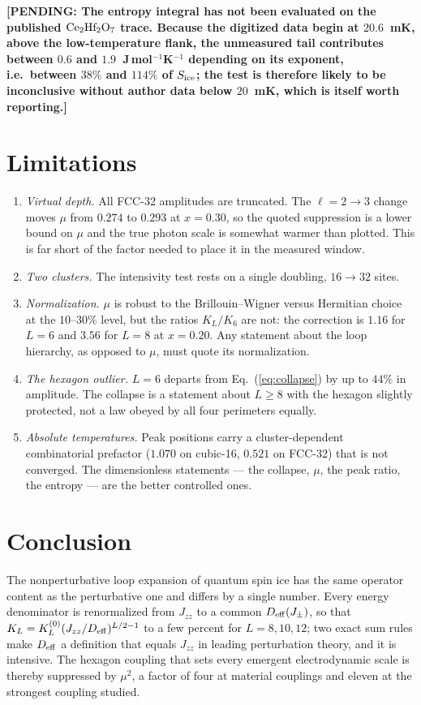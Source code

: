 \documentclass[aps,prb,preprint,amsmath,amssymb,superscriptaddress,
longbibliography,floatfix]{revtex4-2}
\newcommand{\Jzz}{J_{zz}}
\newcommand{\Jpm}{J_{\pm}}
\newcommand{\Deff}{D_{\rm eff}}
\newcommand{\pending}[1]{{\color{red}\textbf{[PENDING: #1]}}}
\begin{document}
\pending{The entropy integral has not been evaluated on the published
$\rm Ce_2Hf_2O_7$ trace.  Because the digitized data begin at $20.6$~mK, above
the low-temperature flank, the unmeasured tail contributes between $0.6$ and
$1.9$~J\,mol$^{-1}$K$^{-1}$ depending on its exponent, i.e.\ between $38\%$ and
$114\%$ of $S_{\rm ice}$; the test is therefore likely to be inconclusive
without author data below $20$~mK, which is itself worth reporting.}

\section{Limitations}
\label{sec:limits}

\begin{enumerate}
\item \emph{Virtual depth.}  All FCC-32 amplitudes are truncated.  The
$\ell=2\rightarrow3$ change moves $\mu$ from $0.274$ to $0.293$ at $x=0.30$,
so the quoted suppression is a lower bound on $\mu$ and the true photon scale
is somewhat warmer than plotted.  This is far short of the factor needed to
place it in the measured window.
\item \emph{Two clusters.}  The intensivity test rests on a single doubling,
$16\rightarrow32$ sites.
\item \emph{Normalization.}  $\mu$ is robust to the Brillouin--Wigner versus
Hermitian choice at the $10$--$30\%$ level, but the ratios $K_L/K_6$ are not:
the correction is $1.16$ for $L=6$ and $3.56$ for $L=8$ at $x=0.20$.  Any
statement about the loop hierarchy, as opposed to $\mu$, must quote its
normalization.
\item \emph{The hexagon outlier.}  $L=6$ departs from Eq.~(\ref{eq:collapse})
by up to $44\%$ in amplitude.  The collapse is a statement about $L\ge8$ with
the hexagon slightly protected, not a law obeyed by all four perimeters
equally.
\item \emph{Absolute temperatures.}  Peak positions carry a cluster-dependent
combinatorial prefactor ($1.070$ on cubic-16, $0.521$ on FCC-32) that is not
converged.  The dimensionless statements --- the collapse, $\mu$, the peak
ratio, the entropy --- are the better controlled ones.
\end{enumerate}

\section{Conclusion}

The nonperturbative loop expansion of quantum spin ice has the same operator
content as the perturbative one and differs by a single number.  Every energy
denominator is renormalized from $\Jzz$ to a common $\Deff(\Jpm)$, so that
$K_L=K_L^{(0)}(\Jzz/\Deff)^{L/2-1}$ to a few percent for $L=8,10,12$; two exact
sum rules make $\Deff$ a definition that equals $\Jzz$ in leading perturbation
theory, and it is intensive.  The hexagon coupling that sets every emergent
electrodynamic scale is thereby suppressed by $\mu^2$, a factor of four at
material couplings and eleven at the strongest coupling studied.
\end{document}

